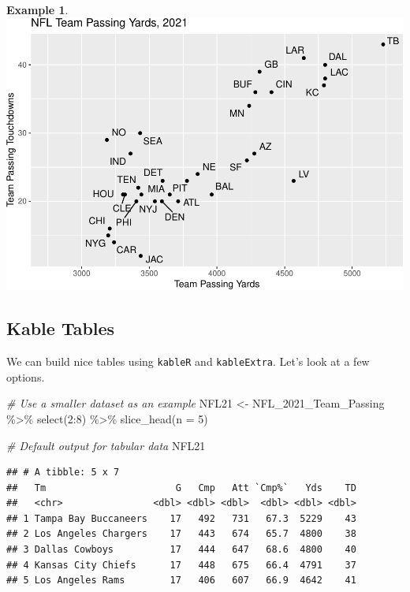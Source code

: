 \documentclass[
  11pt,
]{book}
\newenvironment{Shaded}{\begin{snugshade}}{\end{snugshade}}
\newcommand{\AttributeTok}[1]{\textcolor[rgb]{0.77,0.63,0.00}{#1}}
\newcommand{\CommentTok}[1]{\textcolor[rgb]{0.56,0.35,0.01}{\textit{#1}}}
\newcommand{\DecValTok}[1]{\textcolor[rgb]{0.00,0.00,0.81}{#1}}
\newcommand{\FunctionTok}[1]{\textcolor[rgb]{0.00,0.00,0.00}{#1}}
\newcommand{\NormalTok}[1]{#1}
\newcommand{\OtherTok}[1]{\textcolor[rgb]{0.56,0.35,0.01}{#1}}
\newcommand{\SpecialCharTok}[1]{\textcolor[rgb]{0.00,0.00,0.00}{#1}}
\theoremstyle{definition}
\theoremstyle{definition}
\newtheorem{example}{Example}[chapter]
\theoremstyle{definition}
\theoremstyle{definition}
\theoremstyle{remark}
\begin{document}
\begin{example}
\includegraphics{series_files/figure-latex/scatter4-1.pdf}
\end{example}

\newpage

\hypertarget{kable-tables}{%
\subsection{Kable Tables}\label{kable-tables}}

We can build nice tables using \texttt{kableR} and \texttt{kableExtra}. Let's look at a few options.

\begin{Shaded}
\begin{Highlighting}[]
\CommentTok{\# Use a smaller dataset as an example}
\NormalTok{NFL21 }\OtherTok{\textless{}{-}}\NormalTok{ NFL\_2021\_Team\_Passing }\SpecialCharTok{\%\textgreater{}\%}
    \FunctionTok{select}\NormalTok{(}\DecValTok{2}\SpecialCharTok{:}\DecValTok{8}\NormalTok{) }\SpecialCharTok{\%\textgreater{}\%}
    \FunctionTok{slice\_head}\NormalTok{(}\AttributeTok{n =} \DecValTok{5}\NormalTok{)}

\CommentTok{\# Default output for tabular data}
\NormalTok{NFL21}
\end{Highlighting}
\end{Shaded}

\begin{verbatim}
## # A tibble: 5 x 7
##   Tm                       G   Cmp   Att `Cmp%`   Yds    TD
##   <chr>                <dbl> <dbl> <dbl>  <dbl> <dbl> <dbl>
## 1 Tampa Bay Buccaneers    17   492   731   67.3  5229    43
## 2 Los Angeles Chargers    17   443   674   65.7  4800    38
## 3 Dallas Cowboys          17   444   647   68.6  4800    40
## 4 Kansas City Chiefs      17   448   675   66.4  4791    37
## 5 Los Angeles Rams        17   406   607   66.9  4642    41
\end{verbatim}
\end{document}
